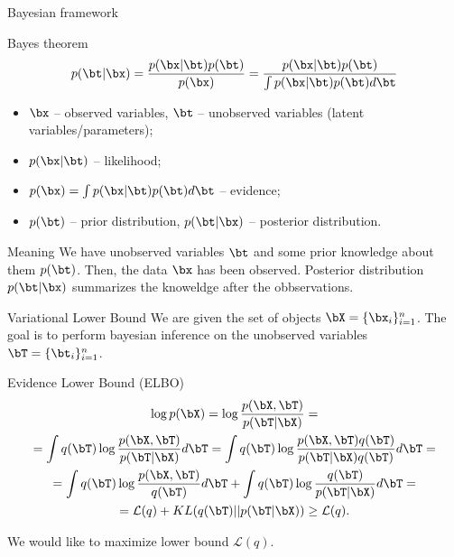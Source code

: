 

\begin{frame}
\titlepage
\end{frame}
\begin{frame}{Bayesian framework}
	\begin{block}{Bayes theorem}
		\[
			p(\bt | \bx) = \frac{p(\bx | \bt) p(\bt)}{p(\bx)} = \frac{p(\bx | \bt) p(\bt)}{\int p(\bx | \bt) p(\bt) d \bt} 
		\]
		\begin{itemize}
			\item $\bx$ -- observed variables, $\bt$ -- unobserved variables (latent variables/parameters);
			\item $p(\bx | \bt)$ -- likelihood;
			\item $p(\bx) = \int p(\bx | \bt) p(\bt) d \bt$ -- evidence;
			\item $p(\bt)$ -- prior distribution, $p(\bt | \bx)$ -- posterior distribution.
		\end{itemize}
	\end{block}
	\begin{block}{Meaning}
		We have unobserved variables $\bt$ and some prior knowledge about them $p(\bt)$. Then, the data $\bx$ has been observed. 
		Posterior distribution $p(\bt | \bx)$ summarizes the knoweldge after the obbservations.
	\end{block}
\end{frame}
\begin{frame}{Variational Lower Bound}
    We are given the set of objects $\bX = \{\bx_i\}_{i=1}^n$. 
    The goal is to perform bayesian inference on the unobserved variables $\bT = \{\bt_i\}_{i=1}^n$.
    \begin{block}{Evidence Lower Bound (ELBO)}
    \vspace{-0.3cm}
        \begin{multline*}
    		\log p(\bX) 
    		= \log \frac{p(\bX, \bT)}{p(\bT|\bX)} = \\ 
    		= \int q(\bT) \log \frac{p(\bX, \bT)}{p(\bT|\bX)}d\bT
    		= \int q(\bT) \log \frac{p(\bX, \bT) q(\bT)}{p(\bT|\bX) q(\bT)} d\bT = \\
    		= \int q(\bT) \log \frac{p(\bX, \bT)}{q(\bT)}d\bT + \int q(\bT) \log \frac{q(\bT)}{p(\bT|\bX)}d\bT = \\ 
    		= \mathcal{L} (q) + KL(q(\bT) || p(\bT|\bX)) \geq \mathcal{L} (q).
    	\end{multline*}
        \vspace{-0.3cm}
    \end{block}
	We would like to maximize lower bound $\mathcal{L}(q)$.
\end{frame}
